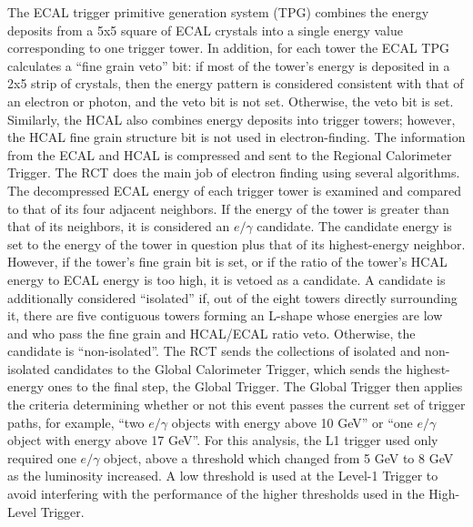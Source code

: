 The ECAL trigger primitive generation system (TPG) combines the energy deposits 
from a 5x5 square of ECAL crystals into a single energy value corresponding to 
one trigger tower. %
In addition, for each tower the ECAL TPG calculates a ``fine grain veto'' bit: 
if most of the tower's energy is deposited in a 2x5 strip of crystals, 
then the energy pattern is considered consistent with that of an electron
or photon, 
and the veto bit is not set.  
Otherwise, the veto bit is set.  
Similarly, the HCAL also combines energy deposits into trigger towers; 
however, the HCAL fine grain structure bit is not used in electron-finding.  
The information from the ECAL and HCAL is compressed and sent to the 
Regional Calorimeter Trigger.  
The RCT does the main job of electron finding using several algorithms.  
The decompressed ECAL energy of each trigger tower is examined and 
compared to that of its four adjacent neighbors.  
If the energy of the tower is greater than that of its neighbors, 
it is considered an $e/\gamma$ candidate.  
The candidate energy is set to the energy of the tower in question 
plus that of its highest-energy neighbor.  
However, if the tower's fine grain bit is set, 
or if the ratio of the tower's HCAL energy to ECAL energy is too high, 
it is vetoed as a candidate.  
A candidate is additionally considered ``isolated'' if, 
out of the eight towers directly surrounding it, 
there are five contiguous towers forming an L-shape whose 
energies are low and who pass the fine grain and HCAL/ECAL ratio veto.  
Otherwise, the candidate is ``non-isolated''.  
The RCT sends the collections of isolated and non-isolated candidates to the 
Global Calorimeter Trigger, 
which sends the highest-energy ones to the final step, the Global Trigger.  
The Global Trigger then applies the criteria determining whether or not 
this event passes the current set of trigger paths,
for example, ``two $e/\gamma$ objects with energy above 10 GeV'' 
or ``one $e/\gamma$ object with energy above 17 GeV''.  
For this analysis, the L1 trigger used only required one $e/\gamma$ 
object, above a threshold which changed from 5 GeV to 8 GeV 
as the luminosity increased.  
A low threshold is used at the Level-1 Trigger 
to avoid interfering with the performance 
of the higher thresholds used in the High-Level Trigger.  




